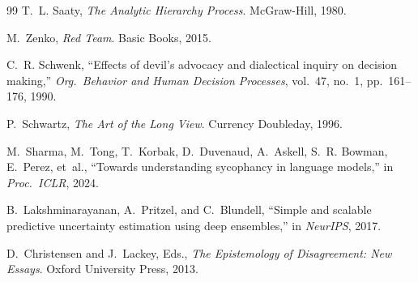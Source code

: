 \documentclass[11pt,a4paper]{article}
\begin{document}
\begin{thebibliography}{99}
T.~L. Saaty, \emph{The Analytic Hierarchy Process}. McGraw-Hill, 1980.

M.~Zenko, \emph{Red Team}. Basic Books, 2015.

C.~R. Schwenk, ``Effects of devil's advocacy and dialectical inquiry on decision making,'' \emph{Org.\ Behavior and Human Decision Processes}, vol.~47, no.~1, pp.~161--176, 1990.

P.~Schwartz, \emph{The Art of the Long View}. Currency Doubleday, 1996.

M.~Sharma, M.~Tong, T.~Korbak, D.~Duvenaud, A.~Askell, S.~R. Bowman, E.~Perez, et~al., ``Towards understanding sycophancy in language models,'' in \emph{Proc.\ ICLR}, 2024.

B.~Lakshminarayanan, A.~Pritzel, and C.~Blundell, ``Simple and scalable predictive uncertainty estimation using deep ensembles,'' in \emph{NeurIPS}, 2017.

D.~Christensen and J.~Lackey, Eds., \emph{The Epistemology of Disagreement: New Essays}. Oxford University Press, 2013.

\end{thebibliography}
\end{document}
